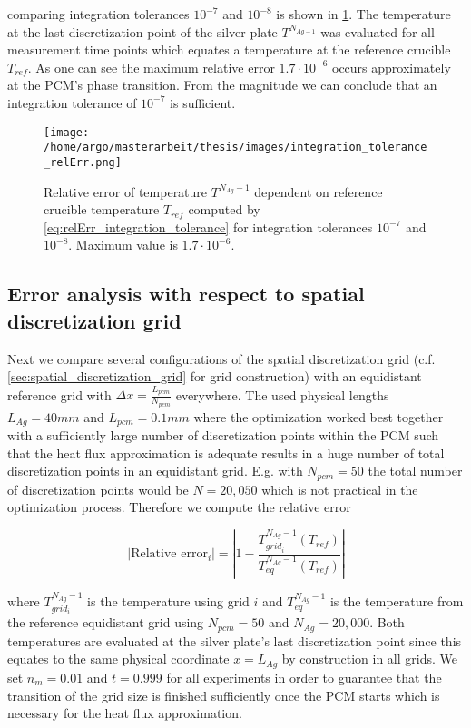\documentclass{scrartcl}[12pt, halfparskip]
\numberwithin{equation}{section}
\numberwithin{figure}{section}
\numberwithin{table}{section}
\begin{document}
comparing integration tolerances $10^{-7}$ and $10^{-8}$  is shown in \cref{fig:integration_tolerance_error}.
The temperature at the last discretization point of the silver plate $T^{N_{Ag-1}}$ was evaluated for all measurement time points which equates a temperature at the reference crucible $T_{ref}$. 
As one can see the maximum relative error $1.7 \cdot 10^{-6}$ occurs approximately at the PCM's phase transition. 
From the magnitude we can conclude that an integration tolerance of $10^{-7}$ is sufficient. \\


\begin{figure}[H]
	\centering
	\texttt{[image: /home/argo/masterarbeit/thesis/images/integration\_tolerance\_relErr.png]}
	\caption{Relative error of temperature $T^{N_{Ag}-1}$ dependent on reference crucible temperature $T_{ref}$ computed by \cref{eq:relErr_integration_tolerance} for integration tolerances $10^{-7}$ and $10^{-8}$. Maximum value is $1.7 \cdot 10^{-6}$.}
	\label{fig:integration_tolerance_error}
\end{figure}


\subsection{Error analysis with respect to spatial discretization grid}
Next we compare several configurations of the spatial discretization grid (c.f. \cref{sec:spatial_discretization_grid} for grid construction) with an equidistant reference grid with $\Delta x = \frac{L_{pcm}}{N_{pcm}}$ everywhere. The used physical lengths $L_{Ag}=40mm$ and $L_{pcm}=0.1mm$ where the optimization worked best together with a sufficiently large number of discretization points within the PCM such that the heat flux approximation is adequate results in a huge number of total discretization points in an equidistant grid. E.g. with $N_{pcm}=50$ the total number of discretization points would be $N=20,050$ which is not practical in the optimization process. Therefore we compute the relative error

\begin{equation}
	| \text{Relative error}_i| = \left| 1 - \frac{T_{{grid}_i}^{N_{Ag}-1}(T_{ref})}{T_{eq}^{N_{Ag}-1}(T_{ref})} \right|
	\label{eq:relErr_grid}
\end{equation}

where $T_{grid_i}^{N_{Ag}-1}$ is the temperature using grid $i$ and $T_{eq}^{N_{Ag}-1}$ is the temperature from the reference equidistant grid using $N_{pcm}=50$ and $N_{Ag}=20,000$. Both temperatures are evaluated at the silver plate's last discretization point since this equates to the same physical coordinate $x=L_{Ag}$ by construction in all grids. 
We set $n_m=0.01$ and $t=0.999$ for all experiments in order to guarantee that the transition of the grid size is finished sufficiently once the PCM starts which is necessary for the heat flux approximation. \\
\end{document}
